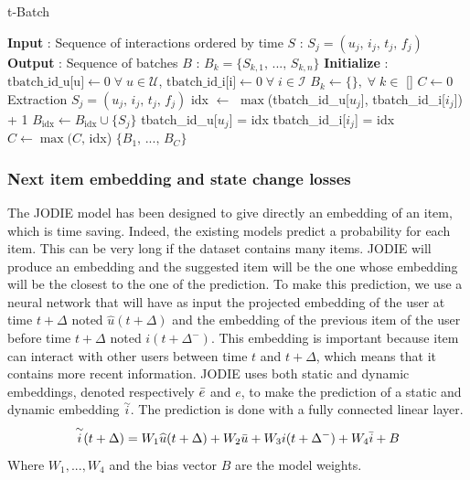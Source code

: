     \begin{algorithm}[H]
        \caption{t-Batch}
        \label{t-batch}
        \begin{algorithmic}[1]
            \STATE \textbf{Input} : Sequence of interactions ordered by time $S$ : $S_j = (u_j,\,i_j,\,t_j,\,f_j)$
            \STATE \textbf{Output} : Sequence of batches $B$ : $B_k = \{S_{k,1},\,...,\,S_{k,n} \}$
            \STATE \textbf{Initialize} : 
            \STATE \quad $\text{tbatch\_id\_u[u]} \leftarrow 0 \; \forall \; u \in \mathcal{U}$, \quad $\text{tbatch\_id\_i[i]} \leftarrow 0 \; \forall \; i \in \mathcal{I}$
            \STATE \quad $B_k \leftarrow \{ \},\; \forall \; k \in$ [\!]
            \STATE \quad $C \leftarrow 0$
                \STATE Extraction $S_j = (u_j,\,i_j,\,t_j,\,f_j)$
                \STATE idx $\leftarrow$ $\max$(tbatch\_id\_u[$u_j$], tbatch\_id\_i[$i_j$]) + 1
                \STATE $B_\text{idx} \leftarrow B_\text{idx} \cup \{ S_j \}$
                \STATE tbatch\_id\_u[$u_j$] = idx
                \STATE tbatch\_id\_i[$i_j$] = idx
                \STATE $C \leftarrow \max(C,\,$idx)
            \ENDFOR
            \RETURN $\{ B_1,\,...,\,B_C \}$
        \end{algorithmic}
    \end{algorithm}



\subsubsection{Next item embedding and state change losses}

The JODIE model has been designed to give directly an embedding of an item, which is time saving. Indeed, the existing models predict a probability for each item. This can be very long if the dataset contains many items. JODIE will produce an embedding and the suggested item will be the one whose embedding will be the closest to the one of the prediction. To make this prediction, we use a neural network that will have as input the projected embedding of the user at time $t+\Delta$ noted $\widehat u(t+\Delta)$ and the embedding of the previous item of the user before time $t+\Delta$ noted $i(t+\Delta^-)$. This embedding is important because item can interact with other users between time $t$ and $t+\Delta$, which means that it contains more recent information. JODIE uses both static and dynamic embeddings, denoted respectively $\Bar{e}$ and $e$, to make the prediction of a static and dynamic embedding $\overset{\sim}{i}$. The prediction is done with a fully connected linear layer.
$$
\overset{\sim}{i} (t+\Delta) = W_1 \widehat u(t+\Delta) + W_2 \Bar{u} + W_3 i(t+\Delta^-) + W_4 \Bar{i} + B
$$
Where $W_1, ..., W_4$ and the bias vector $B$ are the model weights.\\

